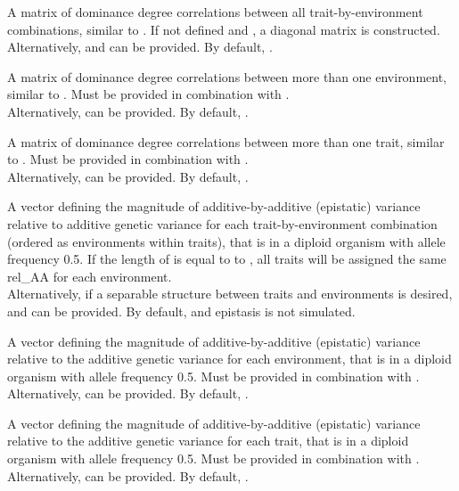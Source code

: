 \documentclass[a4paper]{book}
\begin{document}
\begin{Arguments}
\begin{ldescription}
\item[\code{cor\_DD}] A matrix of dominance degree correlations between all trait-by-environment
combinations, similar to . If not defined and , a diagonal
matrix is constructed. \\{}
Alternatively,  and  can be provided. By default,
.

\item[\code{E\_cor\_DD}] A matrix of dominance degree correlations between more than one environment,
similar to . Must be provided in combination with . \\{}
Alternatively,  can be provided. By default, .

\item[\code{T\_cor\_DD}] A matrix of dominance degree correlations between more than one trait, similar
to . Must be provided in combination with . \\{}
Alternatively,  can be provided. By default, .

\item[\code{rel\_AA}] A vector defining the magnitude of additive-by-additive (epistatic) variance
relative to additive genetic variance for each trait-by-environment combination (ordered as
environments within traits), that is in a diploid organism with allele frequency 0.5. If the
length of  is equal to to , all traits will be assigned the same
rel\_AA for each environment.\\{}
Alternatively, if a separable structure between traits and environments is desired,
 and  can be provided. By default,  and
epistasis is not simulated.

\item[\code{E\_rel\_AA}] A vector defining the magnitude of additive-by-additive (epistatic) variance
relative to the additive genetic variance for each environment, that is in a diploid organism
with allele frequency 0.5. Must be provided in combination with . \\{}
Alternatively,  can be provided. By default, .

\item[\code{T\_rel\_AA}] A vector defining the magnitude of additive-by-additive (epistatic) variance
relative to the additive genetic variance for each trait, that is in a diploid organism with
allele frequency 0.5. Must be provided in combination with . \\{}
Alternatively,  can be provided. By default, .


\end{ldescription}
\end{Arguments}
\end{document}
